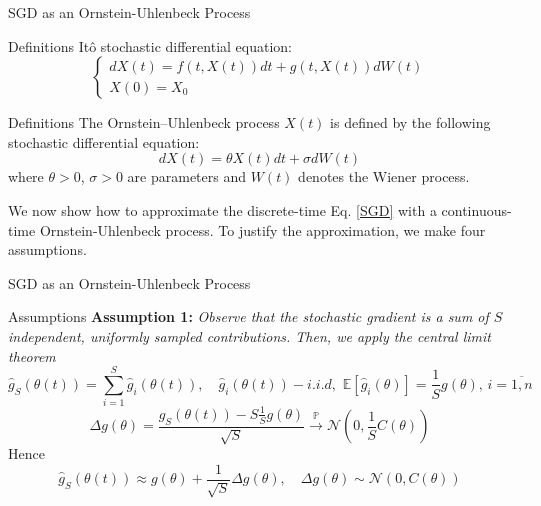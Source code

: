 \documentclass{beamer}
\begin{document}
\begin{frame}{SGD as an Ornstein-Uhlenbeck Process}
    \begin{block}{Definitions}
    Itô stochastic differential equation:
    \begin{equation}\label{ito_diff_eq}
    \begin{cases}
        dX(t) = f\left(t, X(t)\right)dt + g\left(t, X(t)\right)dW(t) \\
        X(0) = X_0
    \end{cases}
    \end{equation}
    \end{block}
    \begin{block}{Definitions}
    The Ornstein–Uhlenbeck process $X(t)$ is defined by the following stochastic differential equation:
    \begin{equation}\label{OU_process}
        dX(t) = \theta X(t)dt + \sigma dW(t)
    \end{equation}
    where $\theta > 0$, $\sigma > 0$ are parameters and $W(t)$ denotes the Wiener process.
    \end{block}
    We now show how to approximate the discrete-time Eq. \ref{SGD} with a continuous-time Ornstein-Uhlenbeck process. To justify the approximation, we make four assumptions.
\end{frame}

\begin{frame}{SGD as an Ornstein-Uhlenbeck Process}
    \begin{block}{Assumptions}
    \textbf{Assumption 1:} \textit{Observe that the stochastic gradient is a sum of $S$ independent, uniformly sampled contributions. Then, we apply the central limit theorem}
    \[\hat{g}_S(\theta(t)) = \sum_{i=1}^S \hat{g}_i(\theta(t)), \quad \hat{g}_i(\theta(t)) - i.i.d,\,\, \mathbb{E}[\hat{g}_i(\theta)] = \dfrac{1}{S}g(\theta),\, i=\overline{1, n}\]
    \[\Delta g(\theta) = \dfrac{\hat{g}_S(\theta(t)) - S\frac{1}{S}g(\theta)}{\sqrt{S}} \overset{\mathbb{P}}{\to} \mathcal{N}\left(0, \frac{1}{S}C(\theta)\right)\]
    Hence
    \begin{equation}\label{assumption_1}
        \hat{g}_S(\theta(t)) \approx g(\theta) + \dfrac{1}{\sqrt{S}}\Delta g(\theta), \quad \Delta g(\theta) \sim \mathcal{N}(0, C(\theta))
    \end{equation}
    \end{block}
\end{frame}
\end{document}
